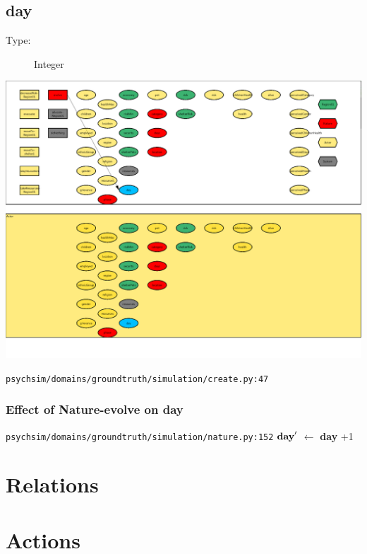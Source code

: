 \documentclass{article}%
\begin{document}
\subsection{day}%
\label{subsec:day}%
\begin{description}%
\item[Type:]%
Integer%
\end{description}%
\includegraphics[width=\textwidth]{images/day.png}%
\begin{flushleft}%
\verb|psychsim/domains/groundtruth/simulation/create.py:47|%
\end{flushleft}%
\subsubsection{Effect of Nature{-}evolve on day}%
\label{ssubsec:Effect of Nature{-}evolve on day}%
\begin{flushleft}%
\verb|psychsim/domains/groundtruth/simulation/nature.py:152|%
\linebreak%
$\mbox{\textbf{day}} '$%
$\leftarrow$%
\textbf{day}%
+1%
\end{flushleft}

%
\section{Relations}%
\label{sec:Relations}%

%
\section{Actions}%
\label{sec:Actions}%
\end{document}
